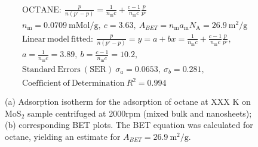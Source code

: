 

\begin{align*}
&\mathrm{OCTANE:}\ \frac{p}{n(p^\circ-p)}=\frac{1}{n_\mathrm{m}c}+\frac{c-1}{n_\mathrm{m}c}\frac{p}{p^\circ}\\
&{n_\mathrm{m}}=0.0709\ \mathrm{mMol/g},\ c=3.63,\ A_{BET}={n_\mathrm{m}}{a_\mathrm{m}}{N_\mathrm{A}}=26.9\ \mathrm{m}^2\mathrm{/g}\\
&\mathrm{Linear\ model\ fitted:}\ \frac{p}{n(p^\circ-p)}=y=a+bx=\frac{1}{n_\mathrm{m}c}+\frac{c-1}{n_\mathrm{m}c}\frac{p}{p^\circ},\\
&a=\frac{1}{n_\mathrm{m}c}=3.89,\ b=\frac{c-1}{n_\mathrm{m}c}=10.2,\\
&\mathrm{Standard\ Errors\ (SER)}\ \sigma_a=0.0653,\ \sigma_b=0.281,\\
&\mathrm{Coefficient\ of\ Determination}\ R^2 = 0.994
\end{align*}


\begin{figure}[htb]
\hfill
{}
\caption{(a) Adsorption isotherm for the adsorption of octane at XXX K on MoS$_2$ 
sample centrifuged at 2000rpm (mixed bulk and nanosheets);
(b) corresponding BET plots. The BET equation was calculated for octane, yielding an estimate for $A_{BET}=26.9\ \mathrm{m}^2\mathrm{/g}$.}

\label{fig:sa-Nanosheets-Prep-I-3000rpm-8mg-01-3mm-30C-S1-SA-10ml}
\end{figure}


